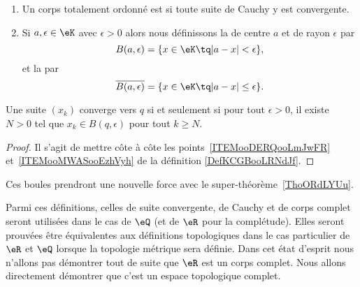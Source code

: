 \begin{definition}
\begin{enumerate}
		\item       \label{ITEMooKZZYooDaidGU}
		      Un corps totalement ordonné est  si toute suite de Cauchy y est convergente.
		\item       \label{ITEMooMWASooEzhVyh}
		      Si \( a,\epsilon\in \eK\) avec \( \epsilon>0\) alors nous définissons la  de centre \( a\) et de rayon \( \epsilon\) par
		      \begin{equation}
			      B(a,\epsilon)=\{ x\in \eK\tq | a-x |<\epsilon \},
		      \end{equation}
		      et la  par
		      \begin{equation}
			      \overline{ B(a,\epsilon) }=\{ x\in \eK\tq | a-x |\leq \epsilon \}.
		      \end{equation}
	\end{enumerate}
\end{definition}

\begin{lemma}
	Une suite \( (x_k)\) converge vers \( q\) si et seulement si pour tout \( \epsilon>0\), il existe \( N>0\) tel que \( x_k\in B(q,\epsilon)\) pour tout \( k\geq N\).
\end{lemma}

\begin{proof}
	Il s'agit de mettre côte à côte les points~\ref{ITEMooDERQooLmJwFR} et~\ref{ITEMooMWASooEzhVyh} de la définition \ref{DefKCGBooLRNdJf}.
\end{proof}

\begin{normaltext}
	Ces boules prendront une nouvelle force avec le super-théorème~\ref{ThoORdLYUu}.
\end{normaltext}

Parmi ces définitions, celles de suite convergente, de Cauchy et de corps complet seront utilisées dans le cas de \( \eQ\) (et de \( \eR\) pour la complétude). Elles seront prouvées être équivalentes aux définitions topologiques dans le cas particulier de \( \eR\) et \( \eQ\) lorsque la topologie métrique sera définie. Dans cet état d'esprit nous n'allons pas démontrer tout de suite que \( \eR\) est un corps complet. Nous allons directement démontrer que c'est un espace topologique complet.

